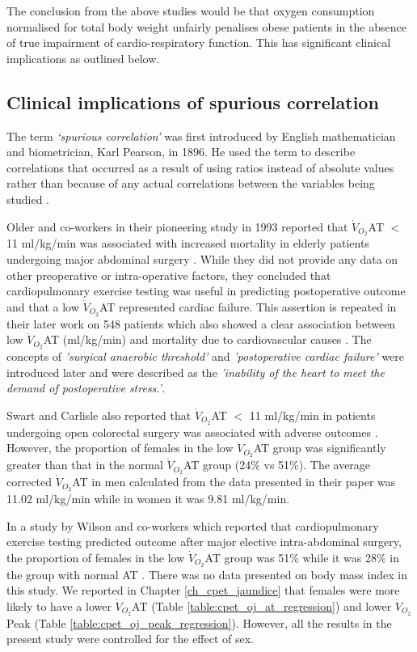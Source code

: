 The conclusion from the above studies would be that oxygen consumption normalised for total body weight unfairly penalises obese patients in the absence of true impairment of cardio-respiratory function. 
This has significant clinical implications as outlined below.

\subsection{Clinical implications of spurious correlation}

The term \textit{`spurious correlation'} was first introduced by English mathematician and biometrician, Karl Pearson, in 1896. 
He used the term to describe correlations that occurred as a result of using ratios instead of absolute values rather than because of any actual correlations between the variables being studied \parencite{pearson_mathematical_1896}.

Older and co-workers in their pioneering study in 1993 reported that $\dot{V}_{O_2}$AT $<$ 11 ml/kg/min was associated with increased mortality in elderly patients undergoing major abdominal surgery \parencite{older_preoperative_1993}. 
While they did not provide any data on other preoperative or intra-operative factors, they concluded that cardiopulmonary exercise testing was useful in predicting postoperative outcome and that a low $\dot{V}_{O_2}$AT represented cardiac failure. 
This assertion is repeated in their later work on 548 patients which also showed a clear association between low $\dot{V}_{O_2}$AT (ml/kg/min) and mortality due to cardiovascular causes \parencite{older_cardiopulmonary_1999}. 
The concepts of \textit{'surgical anaerobic threshold'} and \textit{'postoperative cardiac failure'} were introduced later and were described as the \textit{'inability of the heart to meet the demand of postoperative stress.'}\parencite{_ats/accp_2003}.

Swart and Carlisle also reported that $\dot{V}_{O_2}$AT $<$ 11 ml/kg/min in patients undergoing open colorectal surgery was associated with adverse outcomes \parencite{swart_case-controlled_2012}. 
However, the proportion of females in the low $\dot{V}_{O_2}$AT group was significantly greater than that in the normal $\dot{V}_{O_2}$AT group (24\% vs 51\%). 
The average corrected $\dot{V}_{O_2}$AT in men calculated from the data presented in their paper was 11.02 ml/kg/min while in women it was 9.81 ml/kg/min. 

In a study by Wilson and co-workers which reported that cardiopulmonary exercise testing predicted outcome after major elective intra-abdominal surgery, the proportion of females in the low $\dot{V}_{O_2}$AT group was 51\% while it was 28\% in the group with normal AT \parencite{wilson_impaired_2010}. 
There was no data presented on body mass index in this study. 
We reported in Chapter \ref{ch_cpet_jaundice} that females were more likely to have a lower $\dot{V}_{O_2}$AT (Table \ref{table:cpet_oj_at_regression}) and lower $\dot{V}_{O_2}$Peak (Table \ref{table:cpet_oj_peak_regression}). 
However, all the results in the present study were controlled for the effect of sex. 

